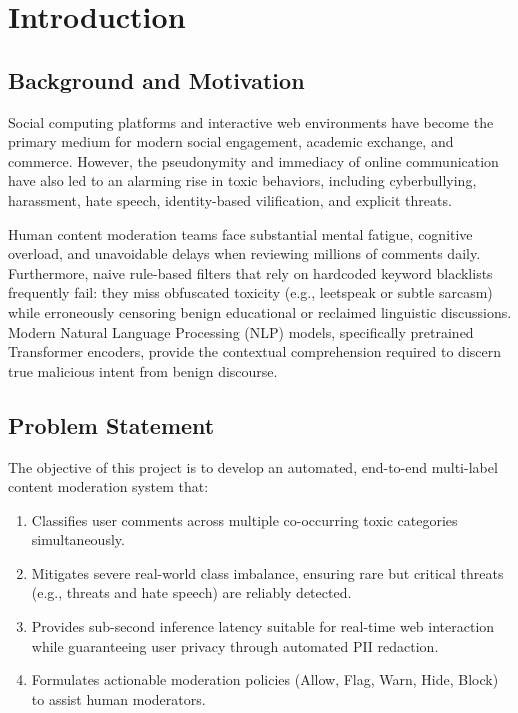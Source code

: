 \documentclass[12pt,a4paper]{article}
\begin{document}
\newpage
\tableofcontents
\newpage
\listoffigures
\newpage
\listoftables

\newpage
\pagestyle{fancy}
\fancyhf{}

\section{Introduction}

\subsection{Background and Motivation}
Social computing platforms and interactive web environments have become the primary medium for modern social engagement, academic exchange, and commerce. However, the pseudonymity and immediacy of online communication have also led to an alarming rise in toxic behaviors, including cyberbullying, harassment, hate speech, identity-based vilification, and explicit threats.

Human content moderation teams face substantial mental fatigue, cognitive overload, and unavoidable delays when reviewing millions of comments daily. Furthermore, naive rule-based filters that rely on hardcoded keyword blacklists frequently fail: they miss obfuscated toxicity (e.g., leetspeak or subtle sarcasm) while erroneously censoring benign educational or reclaimed linguistic discussions. Modern Natural Language Processing (NLP) models, specifically pretrained Transformer encoders, provide the contextual comprehension required to discern true malicious intent from benign discourse.

\subsection{Problem Statement}
The objective of this project is to develop an automated, end-to-end multi-label content moderation system that:
\begin{enumerate}
    \item Classifies user comments across multiple co-occurring toxic categories simultaneously.
    \item Mitigates severe real-world class imbalance, ensuring rare but critical threats (e.g., threats and hate speech) are reliably detected.
    \item Provides sub-second inference latency suitable for real-time web interaction while guaranteeing user privacy through automated PII redaction.
    \item Formulates actionable moderation policies (Allow, Flag, Warn, Hide, Block) to assist human moderators.
\end{enumerate}
\end{document}

